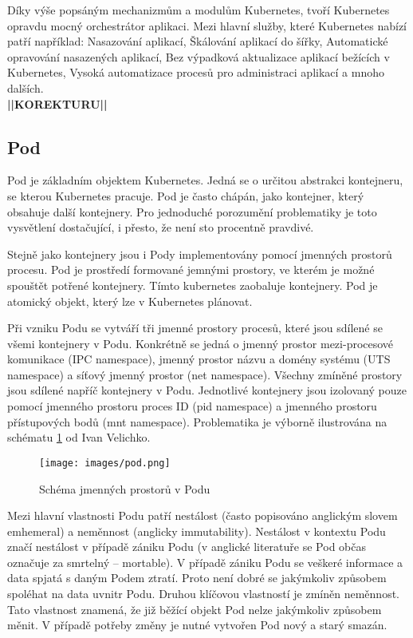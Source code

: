 Díky výše popsáným mechanizmům a modulům Kubernetes, tvoří Kubernetes opravdu mocný orchestrátor aplikaci. Mezi hlavní služby, které Kubernetes nabízí patří například: Nasazování aplikací, Škálování aplikací do šířky, Automatické opravování nasazených aplikací, Bez výpadková aktualizace aplikací bežících v Kubernetes, Vysoká automatizace procesů pro administraci aplikací a mnoho dalších. \cite{poulton_2022_the}\\
\textbf{||KOREKTURU||}
\subsection{Pod}
Pod je základním objektem Kubernetes. Jedná se o určitou abstrakci kontejneru, se kterou Kubernetes pracuje. Pod je často chápán, jako kontejner, který obsahuje další kontejnery. Pro jednoduché porozumění problematiky je toto vysvětlení dostačující, i přesto, že není sto procentně pravdivé.

Stejně jako kontejnery jsou i Pody implementovány pomocí jmenných prostorů procesu. Pod je prostředí formované jemnými prostory, ve kterém je možné spouštět potřené kontejnery. Tímto kubernetes zaobaluje kontejnery. Pod je atomický objekt, který lze v Kubernetes plánovat.

Při vzniku Podu se vytváří tři jmenné prostory procesů, které jsou sdílené se všemi kontejnery v Podu. Konkrétně se jedná o jmenný prostor mezi-procesové komunikace (IPC namespace), jmenný prostor názvu a domény systému (UTS namespace) a síťový jmenný prostor (net namespace). Všechny zmíněné prostory jsou sdílené napříč kontejnery v Podu. Jednotlivé kontejnery jsou izolovaný pouze pomocí jmenného prostoru proces ID (pid namespace)
a jmenného prostoru přístupových bodů (mnt namespace). Problematika je výborně ilustrována na schématu \ref{img:podSchema} od Ivan Velichko.
\begin{figure}[ht]
\centering
\texttt{[image: images/pod.png]}
\caption[Schéma jmenných prostorů v Podu]{Schéma jmenných prostorů v Podu \cite{velichko_2021_kubernetes}}\label{img:podSchema}
\end{figure}

Mezi hlavní vlastnosti Podu patří nestálost (často popisováno anglickým slovem emhemeral) a neměnnost (anglicky immutability). Nestálost v kontextu Podu značí nestálost v případě zániku Podu (v anglické literatuře se Pod občas označuje za smrtelný -- mortable). V případě zániku Podu se veškeré informace a data spjatá s daným Podem ztratí. Proto není dobré se jakýmkoliv způsobem spoléhat na data uvnitr Podu. Druhou klíčovou vlastností je zmíněn neměnnost. Tato vlastnost znamená, že již běžící objekt Pod nelze jakýmkoliv způsobem měnit. V případě potřeby změny je nutné vytvořen Pod nový a starý smazán. \cite{poulton_2022_the}

